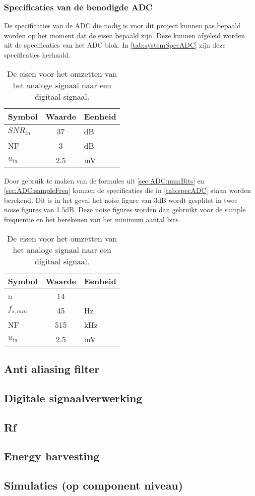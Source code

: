 \subsubsection{Specificaties van de benodigde ADC}
De specificaties van de ADC die nodig is voor dit project kunnen pas bepaald worden op het moment dat de eisen bepaald zijn. Deze kunnen afgeleid worden uit de specificaties van het ADC blok. In \autoref{tab:systemSpecADC} zijn deze specificaties herhaald.
\begin{table}[ht]
    \centering
    \begin{tabular}{l|c|l}
        Symbol      & Waarde & Eenheid\\\hline
        $SNR_{in}$  & 37        & dB\\
        NF          & 3         & dB\\
        $u_{in}$    & 2.5       & mV\\
    \end{tabular}
    \caption{De eisen voor het omzetten van het analoge signaal naar een digitaal signaal.}
    \label{tab:systemSpecADC}
\end{table}
Door gebruik te maken van de formules uit \autoref{sec:ADC:numBits} en \autoref{sec:ADC:sampleFreq} kunnen de specificaties die in \autoref{tab:specADC} staan worden berekend. Dit is in het geval het noise figure van 3dB wordt gesplitst in twee noise figures van 1.5dB. Deze noise figures worden dan gebruikt voor de sample frequentie en het berekenen van het minimum aantal bits.
\begin{table}[ht]
    \centering
    \begin{tabular}{l|c|l}
        Symbol      & Waarde    & Eenheid\\\hline
        n           & 14        & \\
        $f_{s,min}$ & 45        & Hz\\
        NF          & 515       & kHz\\
        $u_{in}$    & 2.5       & mV\\
    \end{tabular}
    \caption{De eisen voor het omzetten van het analoge signaal naar een digitaal signaal.}
    \label{tab:specADC}
\end{table}

\subsection{Anti aliasing filter}

\subsection{Digitale signaalverwerking}

\subsection{Rf}

\subsection{Energy harvesting}

\subsection{Simulaties (op component niveau)}
